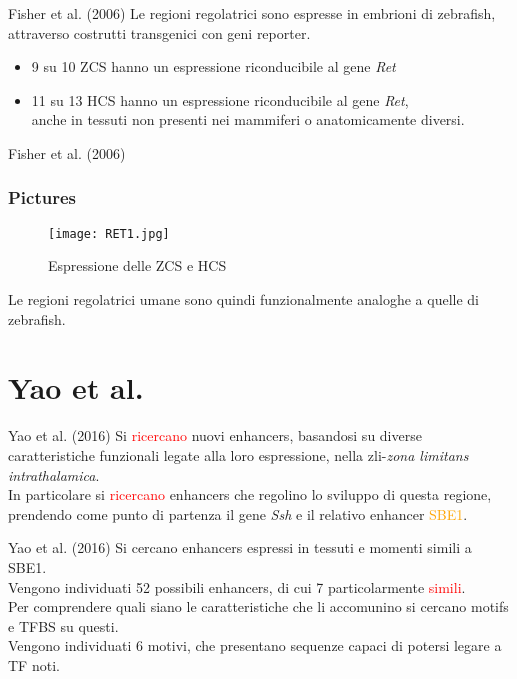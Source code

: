 \documentclass{beamer}
\newcommand{\warn}[1]{\textcolor{red}{#1}}
\begin{document}
    \begin{frame}{Fisher et al. (2006)}
        Le regioni regolatrici sono espresse in embrioni di zebrafish,
        attraverso costrutti transgenici con geni reporter.
        \begin{itemize}
            \item 9 su 10 ZCS hanno un espressione riconducibile al gene \emph{Ret}
            \item 11 su 13 HCS hanno un espressione riconducibile al gene \emph{Ret},\\
            anche in tessuti non presenti nei mammiferi o anatomicamente diversi.
        \end{itemize}
    \end{frame}


    \begin{frame}{Fisher et al. (2006)}
        \frametitle{Pictures}
        \begin{figure}
            \texttt{[image: RET1.jpg]}
            \caption{Espressione delle ZCS e HCS}
        \end{figure}
        Le regioni regolatrici umane sono quindi funzionalmente analoghe a quelle di zebrafish.
    \end{frame}

    \section{Yao et al.}

    \begin{frame}{Yao et al. (2016)}
        Si \warn{ricercano} nuovi enhancers, basandosi su diverse caratteristiche funzionali
        legate alla loro espressione, nella zli-\emph{zona limitans intrathalamica}.\\
        In particolare si \warn{ricercano} enhancers che regolino lo sviluppo di questa regione,
        prendendo come punto di partenza il gene \emph{Ssh} e il relativo enhancer \textcolor{orange}{SBE1}.
    \end{frame}


    \begin{frame}{Yao et al. (2016)}
        Si cercano enhancers espressi in tessuti e momenti simili a SBE1.\\
        Vengono individuati 52 possibili enhancers, di cui 7 particolarmente \warn{simili}.\\
        Per comprendere quali siano le caratteristiche che li accomunino si
        cercano motifs e TFBS su questi.\\
        Vengono individuati 6 motivi, che presentano sequenze capaci di potersi legare a TF noti.
    \end{frame}
\end{document}
